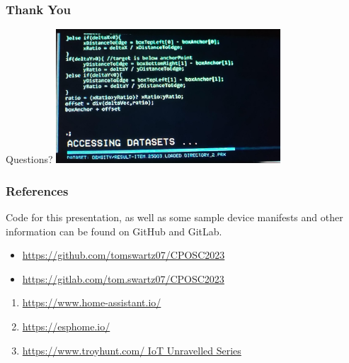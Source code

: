 \documentclass[aspectratio=169]{beamer}
\begin{document}
\begin{frame}
  \frametitle{Thank You}
  \begin{center}
    \LARGE{Questions?}
    \vfill
    \includegraphics[height=5cm]{images/lol-code.jpg}
  \end{center}
\end{frame}
\begin{frame}
  \frametitle{References}
  Code for this presentation, as well as some sample device manifests and other
  information can be found on GitHub and GitLab.
  \begin{itemize}
    \item{\href{https://github.com/tomswartz07/CPOSC2020}{https://github.com/tomswartz07/CPOSC2023}}
    \item{\href{https://gitlab.com/tom.swartz07/CPOSC2020}{https://gitlab.com/tom.swartz07/CPOSC2023}}
  \end{itemize}
  \vfill
  \begin{enumerate}
    \item{\href{https://www.home-assistant.io/}{https://www.home-assistant.io/}}
    \item{\href{https://esphome.io/}{https://esphome.io/}}
    \item{\href{https://www.troyhunt.com/iot-unravelled-part-1-its-a-mess-but-then-theres-home-assistant/}{https://www.troyhunt.com/ IoT Unravelled Series}}
  \end{enumerate}
\end{frame}
\end{document}
